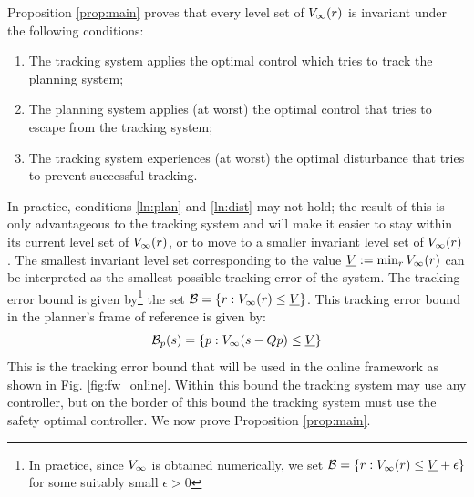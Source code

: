 Proposition \ref{prop:main} proves that every level set of $V_\infty(r)$ is invariant under the following conditions:
\begin{enumerate}
  \item The tracking system applies the optimal control which tries to track the planning system;
  \item The planning system applies (at worst) the optimal control that tries to escape from the tracking system; \label{ln:plan}
  \item The tracking system experiences (at worst) the optimal disturbance that tries to prevent successful tracking. \label{ln:dist}
\end{enumerate}
In practice, conditions \ref{ln:plan} and \ref{ln:dist} may not hold; the result of this is only advantageous to the tracking system and will make it easier to stay within its current level set of $V_\infty(r)$, or to move to a smaller invariant level set of $V_\infty(r)$. The smallest invariant level set corresponding to the value $\underline{V} := \min_{r} V_\infty(r)$ can be interpreted as the smallest possible tracking error of the system. The tracking error bound is given by\footnote{In practice, since $V_\infty$ is obtained numerically, we set $\mathcal B = \{r: V_\infty(r) \le \underline{V} + \epsilon\}$ for some suitably small $\epsilon>0$} the set $\mathcal B = \{r: V_\infty(r) \le \underline{V}\}$. This tracking error bound in the planner's frame of reference is given by:
\begin{equation} \label{eq:TEBp}
\mathcal B_p(s) = \{p: V_\infty(s-Qp) \le \underline{V}\}
\end{equation}
This is the tracking error bound that will be used in the online framework as shown in Fig. \ref{fig:fw_online}. Within this bound the tracking system may use any controller, but on the border of this bound the tracking system must use the safety optimal controller. We now prove Proposition \ref{prop:main}.

